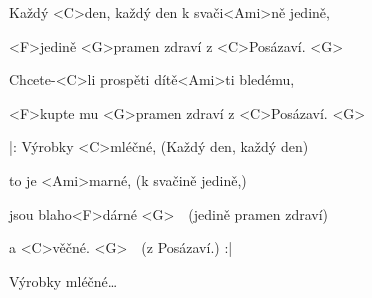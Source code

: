 

\zs
Každý <C>den, každý den k svači<Ami>ně jedině,

<F>jedině <G>pramen zdraví z <C>Posázaví. <G>

Chcete-<C>li prospěti dítě<Ami>ti bledému,

<F>kupte mu <G>pramen zdraví z <C>Posázaví. <G>
\ks

\zr
|: Výrobky <C>mléčné, (Každý den, každý den)

to je <Ami>marné, (k svačině jedině,)

jsou blaho<F>dárné <G>\ \ (jedině pramen zdraví)

a <C>věčné. <G>\ \  (z Posázaví.) :|

\kr

\zr
Výrobky mléčné…
\kr
\kp
